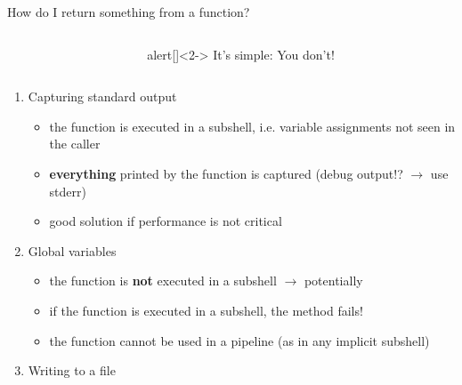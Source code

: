 \begin{frame}[fragile]{How do I return something from a function?}
    \vspace{-18.2mm}
    \begin{overlayarea}{\textwidth}{0.7\textheight}
        \begin{columns}[c]
            \begin{column}{0.55\textwidth}
            \end{column}
            \begin{column}{0.35\textwidth}
                \begin{varblock}{alert}[\textwidth]{}<2->
                    \Large It's simple: \alert{You don't!}
                \end{varblock}
            \end{column}
        \end{columns}
        \smallskip
        \begin{enumerate}
            \item<only@3-> Capturing standard output
                           \begin{itemize}[<only@{3,7}>]
                               \item[\crossmark] the function is executed in a subshell, i.e. variable assignments not seen in the caller
                               \item[\crossmark] \textbf{everything} printed by the function is captured (debug output!? $\to$ use stderr)
                               \item[\checkmark] good solution if performance is not critical
                           \end{itemize}
            \item<only@4-> Global variables
                           \begin{itemize}[<only@{4,7}>]
                               \item[\checkmark] the function is \textbf{not} executed in a subshell $\to$ potentially 
                               \item[\crossmark] if the function is executed in a subshell, the method fails!
                               \item[\crossmark] the function cannot be used in a pipeline (as in any implicit subshell)
                           \end{itemize}
            \item<only@5-> Writing to a file

\end{enumerate}
\end{overlayarea}
\end{frame}

